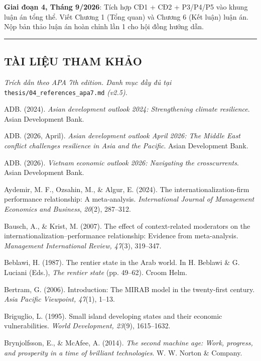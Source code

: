 \documentclass[12pt,a4paper]{article}
\begin{document}
\textbf{Giai đoạn 4, Tháng 9/2026}: Tích hợp CĐ1 + CĐ2 + P3/P4/P5 vào
khung luận án tổng thể. Viết Chương 1 (Tổng quan) và Chương 6 (Kết luận)
luận án. Nộp bản thảo luận án hoàn chỉnh lần 1 cho hội đồng hướng dẫn.

\begin{center}\rule{0.5\linewidth}{0.5pt}\end{center}

\hypertarget{tuxe0i-liux1ec7u-tham-khux1ea3o}{%
\subsection{TÀI LIỆU THAM KHẢO}\label{tuxe0i-liux1ec7u-tham-khux1ea3o}}

\emph{Trích dẫn theo APA 7th edition. Danh mục đầy đủ tại}
\texttt{thesis/04\_references\_apa7.md} \emph{(v2.5).}

ADB. (2024). \emph{Asian development outlook 2024: Strengthening climate
resilience}. Asian Development Bank.

ADB. (2026, April). \emph{Asian development outlook April 2026: The
Middle East conflict challenges resilience in Asia and the Pacific}.
Asian Development Bank.

ADB. (2026). \emph{Vietnam economic outlook 2026: Navigating the
crosscurrents}. Asian Development Bank.

Aydemir, M. F., Ozsahin, M., \& Algur, E. (2024). The
internationalization-firm performance relationship: A meta-analysis.
\emph{International Journal of Management Economics and Business},
\emph{20}(2), 287--312.

Bausch, A., \& Krist, M. (2007). The effect of context-related
moderators on the internationalization--performance relationship:
Evidence from meta-analysis. \emph{Management International Review,
47}(3), 319--347.

Beblawi, H. (1987). The rentier state in the Arab world. In H. Beblawi
\& G. Luciani (Eds.), \emph{The rentier state} (pp. 49--62). Croom Helm.

Bertram, G. (2006). Introduction: The MIRAB model in the twenty-first
century. \emph{Asia Pacific Viewpoint, 47}(1), 1--13.

Briguglio, L. (1995). Small island developing states and their economic
vulnerabilities. \emph{World Development, 23}(9), 1615--1632.

Brynjolfsson, E., \& McAfee, A. (2014). \emph{The second machine age:
Work, progress, and prosperity in a time of brilliant technologies}. W.
W. Norton \& Company.
\end{document}
